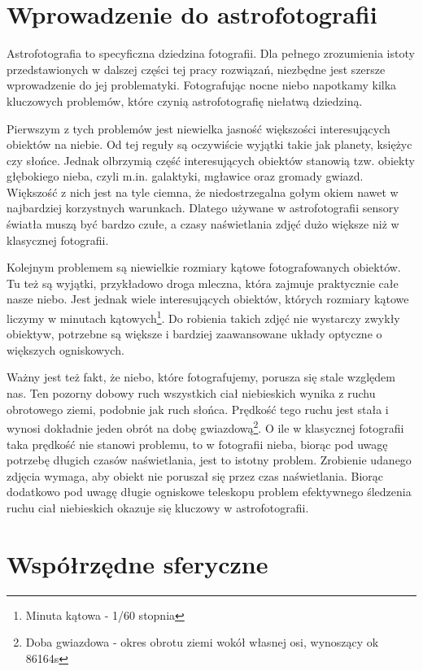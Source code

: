 \section{Wprowadzenie do astrofotografii}

Astrofotografia to specyficzna dziedzina fotografii. Dla pełnego zrozumienia
istoty przedstawionych w dalszej części tej pracy rozwiązań, niezbędne jest
szersze wprowadzenie do jej problematyki. Fotografując nocne niebo napotkamy
kilka kluczowych problemów, które czynią astrofotografię niełatwą dziedziną.

Pierwszym z tych problemów jest niewielka jasność większości interesujących
obiektów na niebie. Od tej reguły są oczywiście wyjątki takie jak planety,
księżyc czy słońce. Jednak olbrzymią część interesujących obiektów stanowią tzw.
obiekty głębokiego nieba, czyli m.in. galaktyki, mgławice oraz gromady gwiazd.
Większość z nich jest na tyle ciemna, że niedostrzegalna gołym okiem nawet
w najbardziej korzystnych warunkach. Dlatego używane w astrofotografii sensory
światła muszą być bardzo czułe, a czasy naświetlania zdjęć dużo większe niż
w klasycznej fotografii.

Kolejnym problemem są niewielkie rozmiary kątowe fotografowanych obiektów. Tu
też są wyjątki, przykładowo droga mleczna, która zajmuje praktycznie całe nasze
niebo. Jest jednak wiele interesujących obiektów, których rozmiary kątowe
liczymy w minutach kątowych\footnote{Minuta kątowa - 1/60 stopnia}. Do robienia
takich zdjęć nie wystarczy zwykły obiektyw, potrzebne są większe i bardziej
zaawansowane układy optyczne o większych ogniskowych.

Ważny jest też fakt, że niebo, które fotografujemy, porusza się stale względem
nas. Ten pozorny dobowy ruch wszystkich ciał niebieskich wynika z ruchu
obrotowego ziemi, podobnie jak ruch słońca. Prędkość tego ruchu jest stała
i wynosi dokładnie jeden obrót na dobę gwiazdową\footnote{Doba gwiazdowa - okres
obrotu ziemi wokół własnej osi, wynoszący ok 86164s}.  O ile w klasycznej
fotografii taka prędkość nie stanowi problemu, to w fotografii nieba, biorąc pod
uwagę potrzebę długich czasów naświetlania, jest to istotny problem. Zrobienie
udanego zdjęcia wymaga, aby obiekt nie poruszał się przez czas naświetlania.
Biorąc dodatkowo pod uwagę długie ogniskowe teleskopu problem efektywnego
śledzenia ruchu ciał niebieskich okazuje się kluczowy w astrofotografii.

\section{Współrzędne sferyczne}


